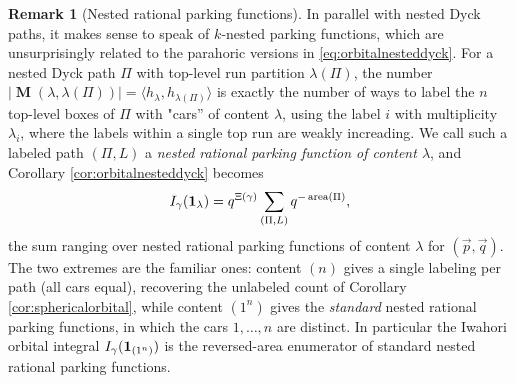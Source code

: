 \documentclass{amsart}
\numberwithin{equation}{section}
\theoremstyle{definition}
\newtheorem{remark}[lemma]{Remark}%
\def\16{{\bf 16}}
\def\1{{\bf 1}}
\def\hat{\widehat}
\DeclareMathOperator{\MM}{\mathbf{M}}
\newcommand{\fqrs}{\hat{\mathbf{f}}_{\vec{p},\vec{q}}}
\DeclareMathOperator{\area}{\mathrm{area}}
\DeclareMathOperator{\dinv}{\mathrm{dinv}}
\begin{document}
\begin{remark}[Nested rational parking functions]
\label{rmk:nestedparking}
In parallel with nested Dyck paths, it makes sense to speak of $k$-nested parking functions, which are unsurprisingly related to the parahoric versions in \eqref{eq:orbitalnesteddyck}. For a nested Dyck path $\Pi$ with top-level run partition $\lambda(\Pi)$, the number $|\MM(\lambda,\lambda(\Pi))|=\langle h_\lambda, h_{\lambda(\Pi)}\rangle$ is exactly the number of ways to label the $n$ top-level boxes of $\Pi$ with "cars'' of content $\lambda$, using the label $i$ with multiplicity $\lambda_i$, where the labels within a single top run are weakly increading. We call such a labeled path $(\Pi,L)$ a {\em nested rational parking function of content $\lambda$}, and Corollary \ref{cor:orbitalnesteddyck} becomes
$$I_\gamma(\1_\lambda)=q^{\Xi(\gamma)}\sum_{(\Pi,L)}q^{-\area(\Pi)},$$
the sum ranging over nested rational parking functions of content $\lambda$ for $(\vec p,\vec q)$. The two extremes are the familiar ones: content $(n)$ gives a single labeling per path (all cars equal), recovering the unlabeled count of Corollary \ref{cor:sphericalorbital}, while content $(1^n)$ gives the {\em standard} nested rational parking functions, in which the cars $1,\ldots,n$ are distinct. In particular the Iwahori orbital integral $I_\gamma(\1_{(1^n)})$ is the reversed-area enumerator of standard nested rational parking functions.

\end{remark}
\end{document}
